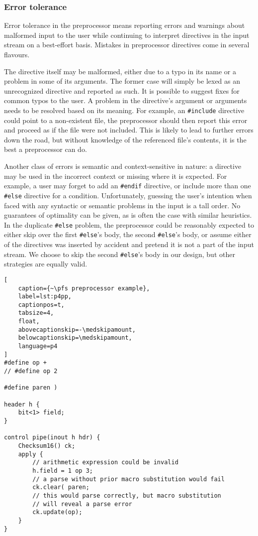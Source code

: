 \subsubsection*{Error tolerance}

Error tolerance in the preprocessor means reporting errors and warnings about
malformed input to the user while continuing to interpret directives in the
input stream on a best-effort basis. Mistakes in preprocessor directives come in
several flavours.

The directive itself may be malformed, either due to a typo in its name or a
problem in some of its arguments. The former case will simply be lexed as an
unrecognized directive and reported as such. It is possible to suggest fixes for
common typos to the user. A problem in the directive's argument or arguments
needs to be resolved based on its meaning. For example, an \texttt{\#include}
directive could point to a non-existent file, the preprocessor should then
report this error and proceed as if the file were not included. This is likely
to lead to further errors down the road, but without knowledge of the referenced
file's contents, it is the best a preprocessor can do.

Another class of errors is semantic and context-sensitive in nature: a directive
may be used in the incorrect context or missing where it is expected. For
example, a user may forget to add an \texttt{\#endif} directive, or include more
than one \texttt{\#else} directive for a condition. Unfortunately, guessing the
user's intention when faced with any syntactic or semantic problems in the input
is a tall order. No guarantees of optimality can be given, as is often the case
with similar heuristics. In the duplicate \texttt{\#else} problem, the
preprocessor could be reasonably expected to either skip over the first
\texttt{\#else}'s body, the second \texttt{\#else}'s body, or assume either of
the directives was inserted by accident and pretend it is not a part of the
input stream. We choose to skip the second \texttt{\#else}'s body in our design,
but other strategies are equally valid.

\begin{lstlisting}[
	caption={~\pfs preprocessor example},
	label=lst:p4pp,
	captionpos=t,
	tabsize=4,
	float,
	abovecaptionskip=-\medskipamount,
	belowcaptionskip=\medskipamount,
	language=p4
]
#define op +
// #define op 2

#define paren )

header h {
	bit<1> field;
}

control pipe(inout h hdr) {
	Checksum16() ck;
	apply {
		// arithmetic expression could be invalid
		h.field = 1 op 3;
		// a parse without prior macro substitution would fail
		ck.clear( paren;
		// this would parse correctly, but macro substitution
		// will reveal a parse error
		ck.update(op);
	}
}
\end{lstlisting}



